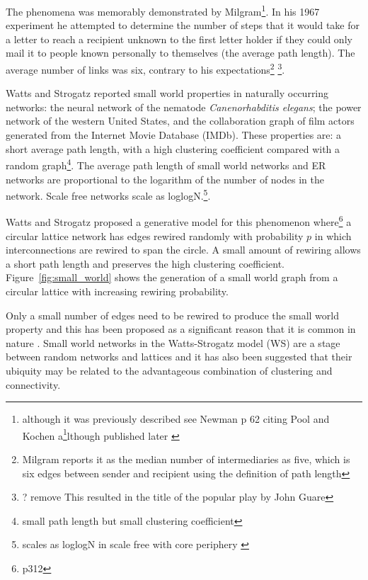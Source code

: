 The phenomena was memorably demonstrated by Milgram\cite{milgram1967small}\footnote{although it was previously described see Newman \cite{newman2018networks}
p 62 citing Pool and Kochen a\footnote{\url{\footnote{(Degree 1:304, Degree 2:293, 3:248 4:245 5:188 6:167)}}}lthough published later \cite{de1978contacts} }. In his 1967 experiment he attempted to determine the number of steps that it would take for a letter to reach a recipient unknown to the first letter holder if they could only mail it to people known personally to themselves (the average path length). The average number of links was six, contrary to his expectations\footnote{Milgram reports it as the median number of intermediaries as five, which is six edges between sender and recipient using the definition of path length} \footnote{? remove This resulted in the title of the popular play by John Guare}. 

Watts and Strogatz \cite{watts1998collective} reported small world properties in naturally occurring networks: the neural network of the nematode \textit{Canenorhabditis elegans}; the power network of the western United States, and the collaboration graph of film actors generated from the Internet Movie Database (IMDb). These properties are: a short average path length, with a high clustering coefficient compared with a random graph\footnote{small path length but small clustering coefficient}. The average path length of small world networks and ER networks are proportional to the logarithm of the number of nodes in the network. Scale free networks scale as loglogN\cite{cohen2003scale}.\footnote{scales as loglogN in scale free with core periphery \cite{boccaletti2006complex}}. 

Watts and Strogatz\cite{watts1998collective} proposed a generative model for this phenomenon where\cite{newman2018networks}\footnote{p312} a circular lattice network has edges rewired randomly with probability $p$ in which interconnections are rewired to span the circle. A small amount of rewiring allows a short path length and preserves the high clustering coefficient. Figure~\ref{fig:small_world} shows the generation of a small world graph from a circular lattice with increasing rewiring probability.

Only a small number of edges need to be rewired to produce the small world property and this has been proposed as a significant reason that it is common in nature \cite{newman2018networks}. Small world networks in the Watts-Strogatz model (WS) are a stage between random networks and lattices and it has also been suggested that their ubiquity may be related to the advantageous combination of clustering and connectivity\cite{latora2001efficient}.

